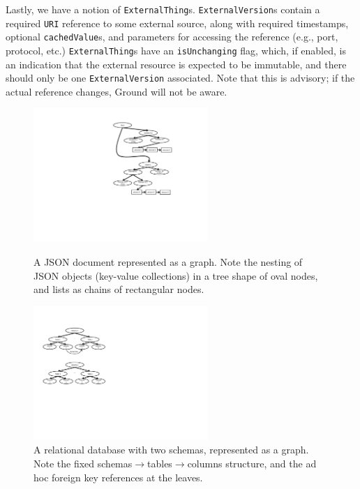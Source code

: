 \documentclass{article}
\newcommand{\uri}{\texttt{URI}\xspace}
\begin{document}
Lastly, we have a notion of \texttt{ExternalThing}s. \texttt {ExternalVersion}s 
contain a required \uri reference to some external source, along with required timestamps, 
optional \texttt{cachedValue}s, and parameters for accessing the
reference (e.g., port, protocol, etc.) \texttt{ExternalThing}s have an \texttt{isUnchanging}
flag, which, if enabled, is an indication that the external resource is expected to be
immutable, and there should only be one \texttt{ExternalVersion} associated.
Note that this is advisory; if the actual reference changes, Ground will not be aware.

\begin{figure}
\centering
\begin{minipage}{0.4\textwidth}
\includegraphics[height=2in]{json.pdf}
\caption{A JSON document represented as a graph.  Note the nesting of JSON objects (key-value collections) in a tree shape of oval nodes, and lists as chains of rectangular nodes.}
\label{fig:json}
\end{minipage}
\hspace{0.1\textwidth}
\begin{minipage}{0.4\textwidth}
\includegraphics[height=2in]{relational.pdf}
\caption{A relational database with two schemas, represented as a graph.  Note the fixed schemas$\rightarrow$tables$\rightarrow$columns structure, and
the ad hoc foreign key references at the leaves.}
\label{fig:relational}
\end{minipage}
\end{figure}
\end{document}
